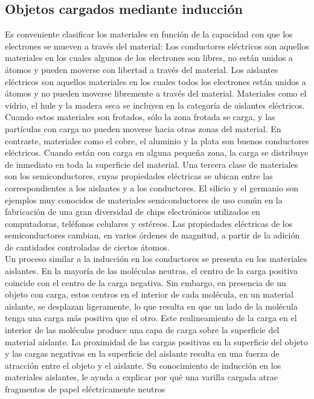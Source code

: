 \documentclass[11pt]{article}
\begin{document}
\begin{multicols}{2}
	\subsection{Objetos cargados mediante inducción}
	Es conveniente clasificar los materiales en función de la capacidad con que los electrones se mueven a través del material: Los conductores eléctricos son aquellos materiales en los cuales 		algunos de los electrones son libres, no están unidos a átomos y pueden moverse con libertad a través del material. Los aislantes eléctricos son aquellos materiales en los cuales todos los electrones 	están unidos a átomos y no pueden moverse libremente a través del material. Materiales como el vidrio, el hule y la madera seca se incluyen en la categoría de aislantes eléctricos. Cuando estos materiales son frotados, sólo la zona frotada se carga, y las partículas con carga no pueden moverse hacia otras zonas del material. En contraste, materiales como el cobre, el aluminio y la plata son buenos conductores eléctricos. Cuando están con carga en alguna pequeña zona, la carga se distribuye de inmediato en toda la superficie del material. Una tercera clase de materiales son los semiconductores, cuyas propiedades eléctricas se ubican entre las correspondientes a los aislantes y a los conductores. El silicio y el germanio son ejemplos muy conocidos de materiales semiconductores de uso común en la fabricación de una gran diversidad de chips electrónicos utilizados en computadoras, teléfonos celulares y estéreos. Las propiedades eléctricas de los semiconductores cambian, en varios órdenes de magnitud, a partir de la adición de cantidades controladas de ciertos átomos.\\
Un proceso similar a la inducción en los conductores se presenta en los materiales aislantes. En la mayoría de las moléculas neutras, el centro de la carga positiva coincide con el centro de la carga negativa. Sin embargo, en presencia de un objeto con carga, estos centros en el interior de cada molécula, en un material aislante, se desplazan ligeramente, lo que resulta en que un lado de la molécula tenga una carga más positiva que el otro. Este realineamiento de la carga en el interior de las moléculas produce una capa de carga sobre la superficie del material aislante. La proximidad de las cargas positivas en la superficie del objeto y las cargas negativas en la superficie del aislante resulta en una fuerza de atracción entre el objeto y el aislante. Su conocimiento de inducción en los materiales aislantes, le ayuda a explicar por qué una varilla cargada atrae fragmentos de papel eléctricamente neutros


\end{multicols}
\end{document}
